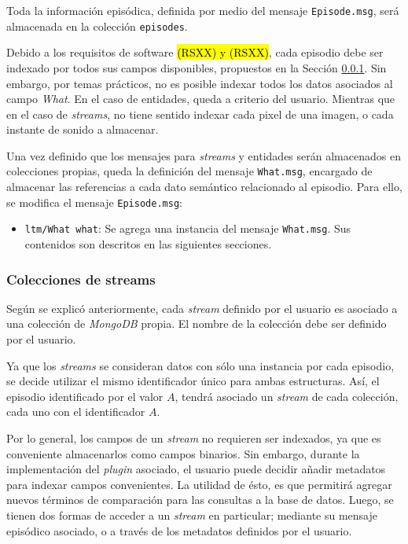 Toda la información episódica, definida por medio del mensaje \texttt{Episode.msg}, será almacenada en la colección \texttt{episodes}.

Debido a los requisitos de software \hl{(RSXX) y (RSXX)}, cada episodio debe ser indexado por todos sus campos disponibles, propuestos en la Sección \ref{}. Sin embargo, por temas prácticos, no es posible indexar todos los datos asociados al campo \textit{What}. En el caso de entidades, queda a criterio del usuario. Mientras que en el caso de \textit{streams}, no tiene sentido indexar cada pixel de una imagen, o cada instante de sonido a almacenar.




Una vez definido que los mensajes para \textit{streams} y entidades serán almacenados en colecciones propias, queda la definición del mensaje \texttt{What.msg}, encargado de almacenar las referencias a cada dato semántico relacionado al episodio. Para ello, se modifica el mensaje \texttt{Episode.msg}:
\begin{itemize}
	\item \texttt{ltm/What what}: Se agrega una instancia del mensaje \texttt{What.msg}. Sus contenidos son descritos en las siguientes secciones.
\end{itemize}



\subsubsection{Colecciones de streams}

Según se explicó anteriormente, cada \textit{stream} definido por el usuario es asociado a una colección de \textit{MongoDB} propia. El nombre de la colección debe ser definido por el usuario. 

Ya que los \textit{streams} se consideran datos con sólo una instancia por cada episodio, se decide utilizar el mismo identificador único para ambas estructuras. Así, el episodio identificado por el valor $A$, tendrá asociado un \textit{stream} de cada colección, cada uno con el identificador $A$.


Por lo general, los campos de un \textit{stream} no requieren ser indexados, ya que es conveniente almacenarlos como campos binarios. Sin embargo, durante la implementación del \textit{plugin} asociado, el usuario puede decidir añadir metadatos para indexar campos convenientes. La utilidad de ésto, es que permitirá agregar nuevos términos de comparación para las consultas a la base de datos. Luego, se tienen dos formas de acceder a un \textit{stream} en particular; mediante su mensaje episódico asociado, o a través de los metadatos definidos por el usuario.

